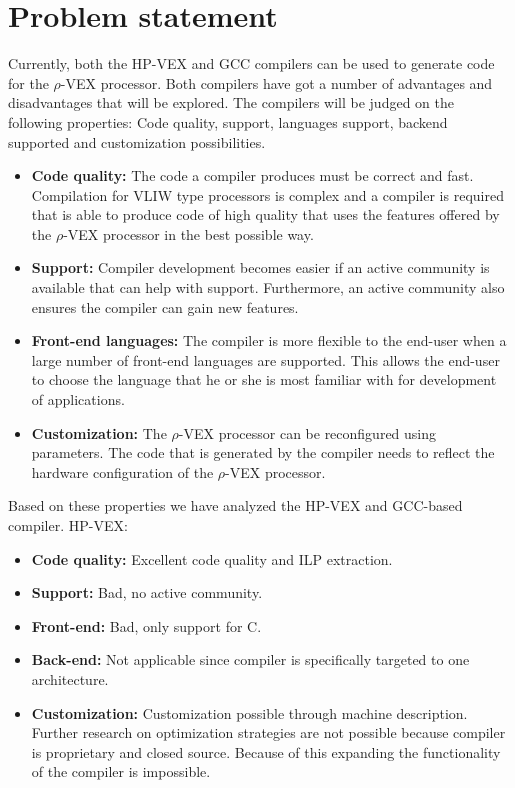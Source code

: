 \section{Problem statement}

Currently, both the HP-VEX and GCC compilers can be used to generate code for the $\rho$-VEX processor. Both compilers have got a number of advantages and disadvantages that will be explored. The compilers will be judged on the following properties: Code quality, support, languages support, backend supported and customization possibilities.

\begin{itemize}
	\item \textbf{Code quality:} The code a compiler produces must be correct and fast. Compilation for VLIW type processors is complex and a compiler is required that is able to produce code of high quality that uses the features offered by the $\rho$-VEX processor in the best possible way.  
	\item \textbf{Support:} Compiler development becomes easier if an active community is available that can help with support. Furthermore, an active community also ensures the compiler can gain new features.
	\item \textbf{Front-end languages:} The compiler is more flexible to the end-user when a large number of front-end languages are supported. This allows the end-user to choose the language that he or she is most familiar with for development of applications. 
	\item \textbf{Customization:} The $\rho$-VEX processor can be reconfigured using parameters. The code that is generated by the compiler needs to reflect the hardware configuration of the $\rho$-VEX processor.  
\end{itemize}

Based on these properties we have analyzed the HP-VEX and GCC-based compiler.
\newline
HP-VEX:
\begin{itemize}
	\item \textbf{Code quality:} Excellent code quality and ILP extraction. 
	\item \textbf{Support:} Bad, no active community.
	\item \textbf{Front-end:} Bad, only support for C.
	\item \textbf{Back-end:} Not applicable since compiler is specifically targeted to one architecture.
	\item \textbf{Customization:} Customization possible through machine description. Further research on optimization strategies are not possible because compiler is proprietary and closed source. Because of this expanding the functionality of the compiler is impossible.
\end{itemize}

